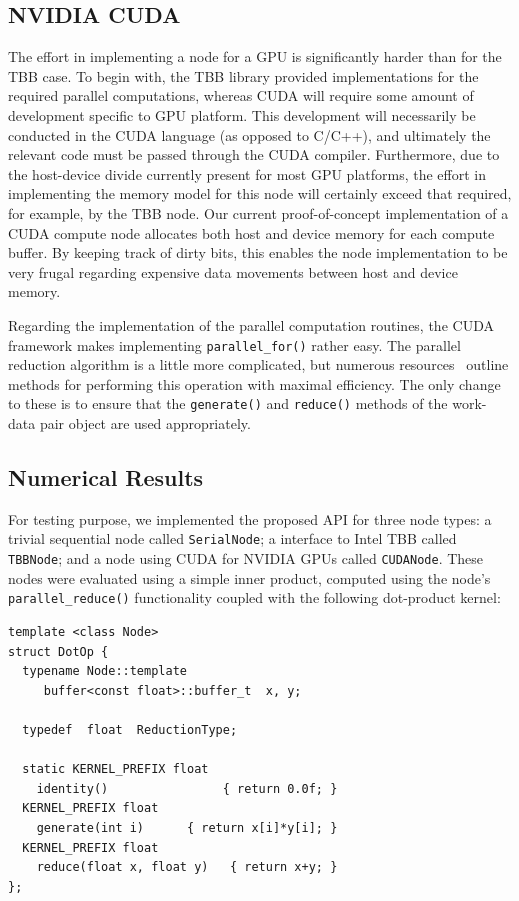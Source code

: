 \documentclass[10pt,conference,letterpaper]{IEEEtran}
\begin{document}
\subsection{NVIDIA CUDA}

The effort in implementing a node for a GPU is significantly harder than for the TBB case. To begin with, the TBB library provided implementations for the required parallel computations, whereas CUDA will require some amount of development specific to GPU platform. This development will necessarily be conducted in the CUDA language (as opposed to C/C++), and ultimately the relevant code must be passed through the CUDA compiler. Furthermore, due to the host-device divide currently present for most GPU platforms, the effort in implementing the memory model for this node will certainly exceed that required, for example, by the TBB node. Our current proof-of-concept implementation of a CUDA compute node allocates both host and device memory for each compute buffer. By keeping track of dirty bits, this enables the node implementation to be very frugal regarding expensive data movements between host and device memory.

Regarding the implementation of the parallel computation routines, the CUDA framework makes implementing \verb!parallel_for()! rather easy. The parallel reduction algorithm is a little more complicated, but numerous resources~\cite{CUDA} outline methods for performing this operation with maximal efficiency. The only change to these is to ensure that the \verb!generate()! and \verb!reduce()! methods of the work-data pair object are used appropriately.

\subsection{Numerical Results}

For testing purpose, we implemented the proposed API for three node types: a trivial sequential node called \verb!SerialNode!; a interface to Intel TBB called \verb!TBBNode!; and a node using CUDA for NVIDIA GPUs called \verb!CUDANode!. These nodes were evaluated using a simple inner product, computed using the node's \verb!parallel_reduce()! functionality coupled with the following dot-product kernel:
{\small \begin{verbatim}
template <class Node>
struct DotOp {
  typename Node::template 
     buffer<const float>::buffer_t  x, y;
     
  typedef  float  ReductionType;
  
  static KERNEL_PREFIX float
    identity()                { return 0.0f; }
  KERNEL_PREFIX float 
    generate(int i)      { return x[i]*y[i]; }
  KERNEL_PREFIX float
    reduce(float x, float y)   { return x+y; }
};
\end{verbatim}}
\end{document}

